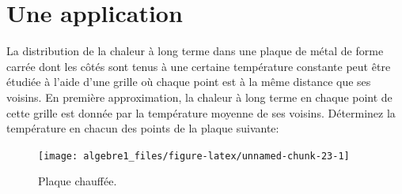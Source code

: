 \documentclass[]{book}
\theoremstyle{definition}
\theoremstyle{definition}
\theoremstyle{definition}
\theoremstyle{remark}
\let\BeginKnitrBlock\begin \let\EndKnitrBlock\end
\begin{document}
\hypertarget{une-application}{%
\section{Une application}\label{une-application}}

\BeginKnitrBlock{example}
\protect\hypertarget{exm:plaque2d}{}{\label{exm:plaque2d} }La distribution de la chaleur à long terme dans une plaque de métal de forme carrée dont les côtés sont tenus à une certaine température constante peut être étudiée à l'aide d'une grille où chaque point est à la même distance que ses voisins. En première approximation, la chaleur à long terme en chaque point de cette grille est donnée par la température moyenne de ses voisins. Déterminez la température en chacun des points de la plaque suivante:
\EndKnitrBlock{example}

\begin{figure}

{\centering \texttt{[image: algebre1\_files/figure-latex/unnamed-chunk-23-1]} 

}

\caption{Plaque chauffée.}\label{fig:unnamed-chunk-23}
\end{figure}
\end{document}
